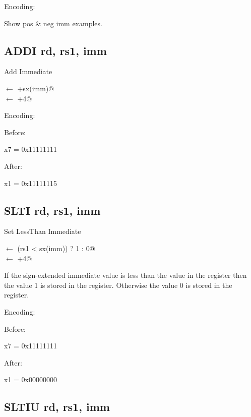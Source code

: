 Encoding:


Show pos \& neg imm examples.

\subsection{ADDI rd, rs1, imm}

Add Immediate

\verb@rd@ $\leftarrow$ +sx(imm)@\\
\verb@pc@ $\leftarrow$ \verb@pc+4@

Encoding:


Before:

x7 = 0x11111111

After:

x1 = 0x11111115

\subsection{SLTI rd, rs1, imm}

Set LessThan Immediate

\verb@rd@ $\leftarrow$ \verb@(rs1 < sx(imm)) ? 1 : 0@\\
\verb@pc@ $\leftarrow$ \verb@pc+4@

If the sign-extended immediate value is less than the value
in the  register then the value 1 is stored in the 
 register.  Otherwise the value 0 is stored in the
 register. 

Encoding:


Before:

x7 = 0x11111111

After:

x1 = 0x00000000

\subsection{SLTIU rd, rs1, imm}


